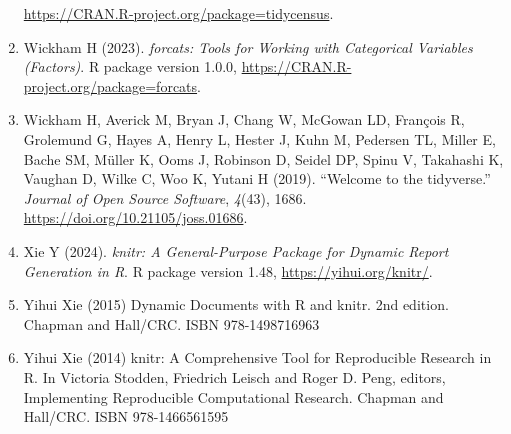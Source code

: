 \documentclass[
]{article}
\begin{document}
\begin{enumerate}
  \url{https://CRAN.R-project.org/package=tidycensus}.
\item
  Wickham H (2023). \emph{forcats: Tools for Working with Categorical
  Variables (Factors)}. R package version 1.0.0,
  \url{https://CRAN.R-project.org/package=forcats}.
\item
  Wickham H, Averick M, Bryan J, Chang W, McGowan LD, François R,
  Grolemund G, Hayes A, Henry L, Hester J, Kuhn M, Pedersen TL, Miller
  E, Bache SM, Müller K, Ooms J, Robinson D, Seidel DP, Spinu V,
  Takahashi K, Vaughan D, Wilke C, Woo K, Yutani H (2019). ``Welcome to
  the tidyverse.'' \emph{Journal of Open Source Software}, \emph{4}(43),
  1686. \url{https://doi.org/10.21105/joss.01686}.
\item
  Xie Y (2024). \emph{knitr: A General-Purpose Package for Dynamic
  Report Generation in R}. R package version 1.48,
  \url{https://yihui.org/knitr/}.
\item
  Yihui Xie (2015) Dynamic Documents with R and knitr. 2nd edition.
  Chapman and Hall/CRC. ISBN 978-1498716963
\item
  Yihui Xie (2014) knitr: A Comprehensive Tool for Reproducible Research
  in R. In Victoria Stodden, Friedrich Leisch and Roger D. Peng,
  editors, Implementing Reproducible Computational Research. Chapman and
  Hall/CRC. ISBN 978-1466561595
\end{enumerate}
\end{document}
